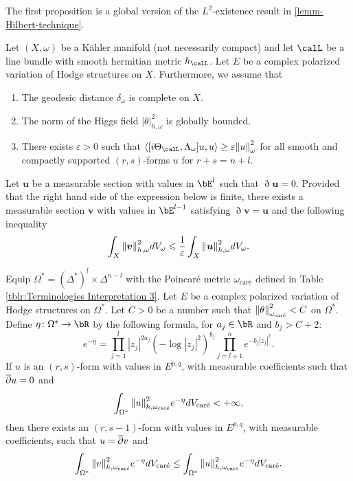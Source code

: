 \documentclass[lang=en,12pt]{beautybook}
\begin{document}
The first proposition is a global version of the $L^{2}$-existence result in \autoref{lemm-Hilbert-technique}.

\begin{theorem}
  Let $(X, \omega)$ be a K\"ahler manifold (not necessarily compact) and let $\calL$ be a line bundle with smooth hermitian metric $h_{\calL}$. Let $E$ be a complex polarized variation of Hodge structures on $X$. Furthermore, we assume that
  \begin{enumerate}
    \item The geodesic distance $\delta_{\omega}$ is complete on $X$.
    \item The norm of the Higgs field $|\theta|_{h, \omega}^{2}$ is globally bounded.
    \item There exists $\varepsilon > 0$ such that $\langle [i\Theta_{\calL}, \Lambda_{\omega}] u, u \rangle \geq  \varepsilon \norm{u}_{\omega}^{2}$ for all smooth and compactly supported $(r, s)$-forms $u$ for $r + s = n + l$.
  \end{enumerate}
  Let $\bm{u}$ be a measurable section with values in $\bE^{l}$ such that $\eth \bm{u} = 0$. Provided that the right hand side of the expression below is finite, there exists a measurable section $\bm{v}$ with values in $\bE^{l-1}$ satisfying $\eth \bm{v} = \bm{u}$ and the following inequality
  $$ \int_{X} \norm{\bm{v}}_{h, \omega}^{2} dV_{\omega} \leqslant \frac{1}{\varepsilon} \int_{X} \norm{\bm{u}}_{h, \omega}^{2} dV_{\omega}.$$
\end{theorem}

\begin{theorem}
  Equip $\Omega^* = (\Delta^*)^{l} \times \Delta^{n-l}$ with the Poincaré metric $\omega_{\text{car\'e}}$ defined in Table \ref{tblr:Terminologies Interpretation 3}. Let $E$ be a complex polarized variation of Hodge structures on $\Omega^*$. Let $C > 0$ be a number such that $\norm{\theta}^{2}_{\omega_{\text{car\'e}}} < C$ on $\Omega^*$. Define $\eta\colon\Omega^* \to \bR$ by the following formula, for $a_{j} \in \bR$ and $b_{j} > C + 2$:
  $$ e^{-\eta} = \prod_{j = 1}^{l} |z_{j}|^{2a_{j}} (-\log |z_{j}|^{2})^{b_{j}} \prod_{j = l+1}^{n} e^{- b_{j} |z_{j}|^{2}}.$$
  If $u$ is an $(r, s)$-form with values in $E^{p,q}$, with measurable coefficients such that $\overline{\partial} u = 0$ and
  $$ \int_{\Omega^*} \norm{u}_{h, \omega_{\text{car\'e}}}^{2} e^{-\eta} dV_{\text{car\'e}} < + \infty,$$
  then there exists an $(r, s-1)$-form with values in $E^{p,q}$, with measurable coefficients, such that $u = \overline{\partial} v$ and
  $$ \int_{\Omega^*} \norm{v}_{h, \omega_{\text{car\'e}}}^{2} e^{-\eta} dV_{\text{car\'e}} \leq \int_{\Omega^*} \norm{u}_{h, \omega_{\text{car\'e}}}^{2} e^{-\eta} dV_{\text{car\'e}}.$$
\end{theorem}
\end{document}
